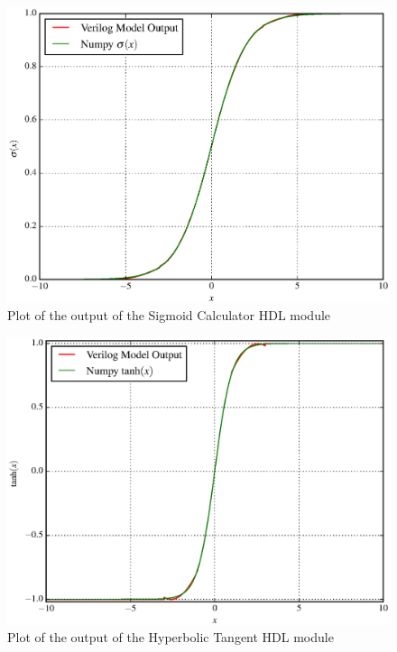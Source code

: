 \documentclass{IEEEtran}
\begin{document}
\begin{figure}[!t]
    \centering
    \includegraphics[width=\linewidth]{figures/nonlin-out.eps}
    \caption{Plot of the output of the Sigmoid Calculator HDL module}
    \label{fig:nonlin-out-sig}
\end{figure}

\begin{figure}[!t]
    \centering
    \includegraphics[width=\linewidth]{figures/nonlin-out-tanh.eps}
    \caption{Plot of the output of the Hyperbolic Tangent HDL module}
    \label{fig:nonlin-out-tanh}
\end{figure}
\end{document}
